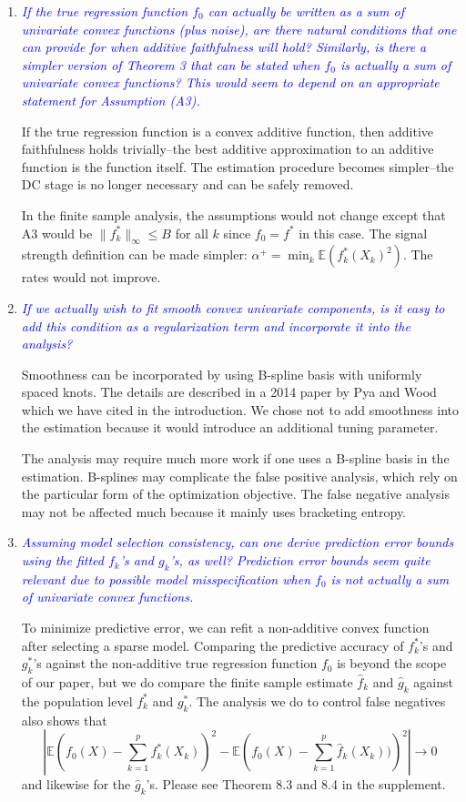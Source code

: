 \documentclass[pdftex,12pt]{article}
\let\hat\widehat
\def\rc#1{{\it\textcolor{blue}{#1}}\smallskip}
\begin{document}
\begin{enumerate}[(1)]
\item \rc{If the true regression function $f_0$ can actually be written as a
sum of univariate convex functions (plus noise), are there natural
conditions that one can provide for when additive faithfulness will
hold? Similarly, is there a simpler version of Theorem 3 that can be
stated when $f_0$ is actually a sum of univariate convex functions? This
would seem to depend on an appropriate statement for Assumption (A3).}

If the true regression function is a convex additive function, then additive faithfulness holds trivially--the best additive approximation to an additive function is the function itself. The estimation procedure becomes simpler--the DC stage is no longer necessary and can be safely removed. 

In the finite sample analysis, the assumptions would not change except that A3 would be $\| f^*_k \|_\infty \leq B$ for all $k$ since $f_0 = f^*$ in this case. The signal strength definition can be made simpler: $\alpha^+ = \min_k \mathbb{E}( f^*_k(X_k)^2 )$. The rates would not improve.


\item \rc{If we actually wish to fit smooth convex univariate components, is
it easy to add this condition as a regularization term and incorporate
it into the analysis?}

Smoothness can be incorporated by using B-spline basis with uniformly spaced knots. The details are described in a 2014 paper by Pya and Wood which we have cited in the introduction. We chose not to add smoothness into the estimation because it would introduce an additional tuning parameter.

The analysis may require much more work if one uses a B-spline basis in the estimation. B-splines may complicate the false positive analysis, which rely on the particular form of the optimization objective. The false negative analysis may not be affected much because it mainly uses bracketing entropy.

\item \rc{Assuming model selection consistency, can one derive prediction
error bounds using the fitted $f_k$'s and $g_k$'s, as well? Prediction error
bounds seem quite relevant due to possible model misspecification when
$f_0$ is not actually a sum of univariate convex functions.}

To minimize predictive error, we can refit a non-additive convex function after selecting a sparse model. Comparing the predictive accuracy of $f^*_k$'s and $g^*_k$'s against the non-additive true regression function $f_0$ is beyond the scope of our paper, but we do compare the finite sample estimate $\hat{f}_k$ and $\hat{g}_k$ against the population level $f^*_k$ and $g^*_k$. The analysis we do to control false negatives also shows that $$\left| \mathbb{E}\left( f_0(X)  - \sum_{k=1}^p f^*_k(X_k) \right)^2 - \mathbb{E} \left( f_0(X) - \sum_{k=1}^p \hat{f}_k(X_k))\right)^2 \right| \rightarrow 0$$ and likewise for the $\hat{g}_k$'s. Please see Theorem 8.3 and 8.4 in the supplement. 


\end{enumerate}
\end{document}
